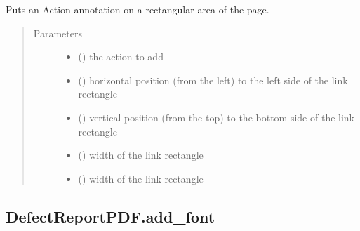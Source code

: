 \documentclass[letterpaper,10pt,english]{sphinxmanual}
\begin{document}
\begin{fulllineitems}
\begin{fulllineitems}
\label{\detokenize{generated/quality_assessment.quality_pdf_report.DefectReportPDF.add_action:quality_assessment.quality_pdf_report.DefectReportPDF.add_action}}
\sphinxAtStartPar
Puts an Action annotation on a rectangular area of the page.
\begin{quote}\begin{description}
\item[{Parameters}] \leavevmode\begin{itemize}
\item {} 
\sphinxAtStartPar
{} () \textendash{} the action to add

\item {} 
\sphinxAtStartPar
{} () \textendash{} horizontal position (from the left) to the left side of the link rectangle

\item {} 
\sphinxAtStartPar
{} () \textendash{} vertical position (from the top) to the bottom side of the link rectangle

\item {} 
\sphinxAtStartPar
{} () \textendash{} width of the link rectangle

\item {} 
\sphinxAtStartPar
{} () \textendash{} width of the link rectangle

\end{itemize}

\end{description}\end{quote}

\end{fulllineitems}



\subsection{DefectReportPDF.add\_font}
\label{\detokenize{generated/quality_assessment.quality_pdf_report.DefectReportPDF.add_font:defectreportpdf-add-font}}\label{\detokenize{generated/quality_assessment.quality_pdf_report.DefectReportPDF.add_font::doc}}


\end{fulllineitems}
\end{document}
